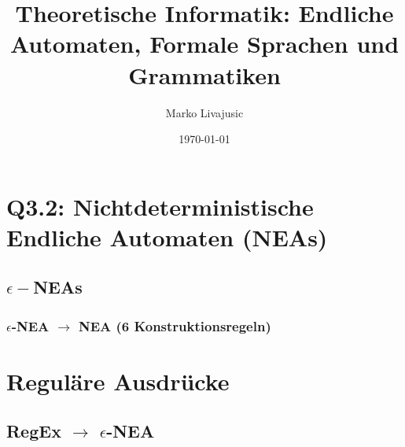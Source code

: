 \documentclass{book}
\author{Marko Livajusic}
\date{\today}
\title{Theoretische Informatik: Endliche Automaten, Formale Sprachen und Grammatiken}
\begin{document}
\maketitle
\tableofcontents
\newpage
\newpage


\section{Q3.2: Nichtdeterministische Endliche Automaten (NEAs)}
\subsection{$\epsilon-$NEAs}
\subsubsection{$\epsilon$-NEA $\rightarrow$ NEA (6 Konstruktionsregeln)}


\section{Reguläre Ausdrücke}
\subsection{RegEx $\rightarrow$ $\epsilon$-NEA}
\end{document}
